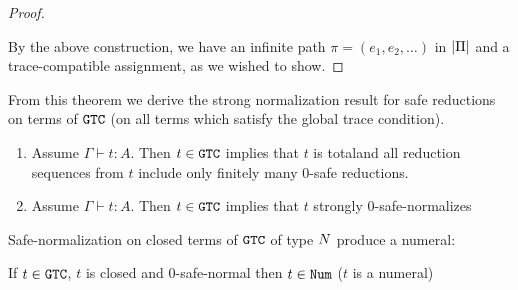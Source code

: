 \begin{proof}
\begin{enumerate}
\begin{enumerate}
\begin{enumerate}
  \end{enumerate}
 \end{enumerate}
\end{enumerate}

By the above construction, we have an infinite path $\pi = (e_1,e_2,\ldots)$ in ${|\Pi|}$
and a trace-compatible assignment, as we wished to show.

  
\end{proof}


From this theorem we derive the strong normalization result for safe reductions on terms of ${\tt GTC}$
(on all terms which satisfy the global trace condition).

\begin{corollary}\label{cor:SN_GTC}
  \begin {enumerate}
  \item
   Assume  $\Gamma\vdash t:A$. Then $t \in {\tt GTC}$ implies that $t$ is totaland all reduction sequences
   from $t$ include only finitely many $0$-safe reductions.
  
\item
   Assume  $\Gamma\vdash t:A$. Then $t \in {\tt GTC}$ implies that $t$ strongly $0$-safe-normalizes
   \end{enumerate}
\end{corollary}

Safe-normalization on closed terms of ${\tt GTC}$ of type ${N}$ produce a numeral:

\begin{proposition}
If $t \in {\tt GTC}$, $t$ is closed and $0$-safe-normal then $t \in {\tt Num}$ ($t$ is a numeral)
\end{proposition}


\newpage

